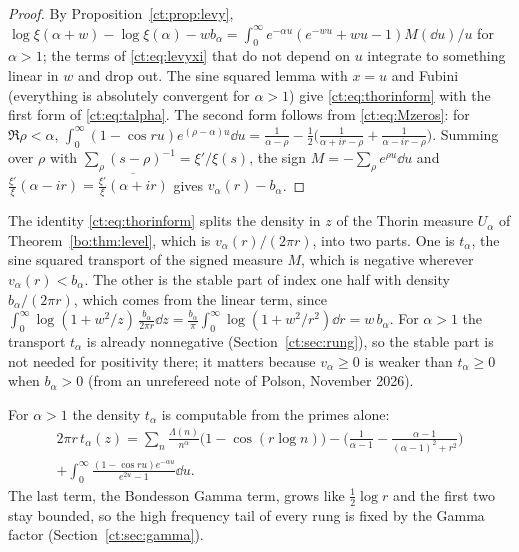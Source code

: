 \begin{proof}
By Proposition~\ref{ct:prop:levy}, $\log\xi(\alpha+w)-\log\xi(\alpha)-wb_\alpha=\int_0^\infty e^{-\alpha u}(e^{-wu}+wu-1)M(\dd u)/u$ for $\alpha>1$; the terms of \eqref{ct:eq:levyxi} that do not depend on $u$ integrate to something linear in $w$ and drop out. The sine squared lemma with $x=u$ and Fubini (everything is absolutely convergent for $\alpha>1$) give \eqref{ct:eq:thorinform} with the first form of \eqref{ct:eq:talpha}. The second form follows from \eqref{ct:eq:Mzeros}: for $\Re\rho<\alpha$, $\int_0^\infty(1-\cos ru)e^{(\rho-\alpha)u}\dd u=\frac1{\alpha-\rho}-\frac12\Big(\frac{1}{\alpha+ir-\rho}+\frac{1}{\alpha-ir-\rho}\Big)$. Summing over $\rho$ with $\sum_\rho(s-\rho)^{-1}=\xi'/\xi(s)$, the sign $M=-\sum_\rho e^{\rho u}\dd u$ and $\frac{\xi'}{\xi}(\alpha-ir)=\overline{\frac{\xi'}{\xi}(\alpha+ir)}$ gives $v_\alpha(r)-b_\alpha$.
\end{proof}

\begin{remark}
The identity \eqref{ct:eq:thorinform} splits the density in $z$ of the Thorin measure $U_\alpha$ of Theorem~\ref{bo:thm:level}, which is $v_\alpha(r)/(2\pi r)$, into two parts. One is $t_\alpha$, the sine squared transport of the signed measure $M$, which is negative wherever $v_\alpha(r)<b_\alpha$. The other is the stable part of index one half with density $b_\alpha/(2\pi r)$, which comes from the linear term, since $\int_0^\infty\log(1+w^2/z)\,\frac{b_\alpha}{2\pi r}\dd z=\frac{b_\alpha}\pi\int_0^\infty\log(1+w^2/r^2)\dd r=w\,b_\alpha$. For $\alpha>1$ the transport $t_\alpha$ is already nonnegative (Section~\ref{ct:sec:rung}), so the stable part is not needed for positivity there; it matters because $v_\alpha\ge0$ is weaker than $t_\alpha\ge0$ when $b_\alpha>0$ (from an unrefereed note of Polson, November 2026).
\end{remark}

For $\alpha>1$ the density $t_\alpha$ is computable from the primes alone:
\begin{multline*}
2\pi r\,t_\alpha(z)=\sum_{n}\frac{\Lambda(n)}{n^{\alpha}}\big(1-\cos(r\log n)\big)-\Big(\frac{1}{\alpha-1}-\frac{\alpha-1}{(\alpha-1)^2+r^2}\Big)\\+\int_0^\infty\frac{(1-\cos ru)e^{-\alpha u}}{e^{2u}-1}\dd u.
\end{multline*}
The last term, the Bondesson Gamma term, grows like $\frac12\log r$ and the first two stay bounded, so the high frequency tail of every rung is fixed by the Gamma factor (Section~\ref{ct:sec:gamma}).

